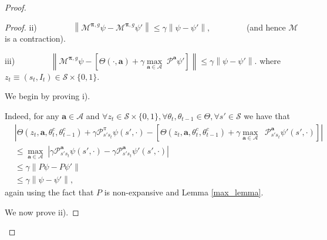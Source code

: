 \documentclass{article}
\begin{document}
\begin{proof}
\begin{proof}
ii) $\qquad\qquad
\left\|\mathcal{M}^{\boldsymbol{\pi},g}\psi-\mathcal{M}^{\boldsymbol{\pi},g}\psi'\right\|\leq    \gamma\left\|\psi-\psi'\right\|,\qquad \qquad$
  (and hence $\mathcal{M}$ is a contraction).

iii) $\qquad\qquad
    \left\|\mathcal{M}^{\boldsymbol{\pi},g}\psi-\left[ \Theta(\cdot,\boldsymbol{a})+\gamma\underset{\boldsymbol{a}\in\boldsymbol{\mathcal{A}}}{\max}\;\mathcal{P}^{\boldsymbol{a}}\psi'\right]\right\|\leq \gamma\left\|\psi-\psi'\right\|.
$
where $z_t\equiv (s_t,I_t)\in\mathcal{S}\times \{0,1\}$.

We begin by proving i).

Indeed, for any $\boldsymbol{a}\in\boldsymbol{\mathcal{A}}$ and $\forall z_t\in\mathcal{S}\times\{0,1\}, \forall \theta_t,\theta_{t-1}\in \Theta, \forall s'\in\mathcal{S}$ we have that 
\begin{align*}
&\left| \Theta(z_t,\boldsymbol{a},\theta^c_t,\theta^c_{t-1})+\gamma\mathcal{P}^\pi_{s's_t}\psi(s',\cdot)-\left[ \Theta(z_t,\boldsymbol{a},\theta^c_t,\theta^c_{t-1})+\gamma\underset{\boldsymbol{a}\in\boldsymbol{\mathcal{A}}}{\max}\;\;\mathcal{P}^{\boldsymbol{a}}_{s's_t}\psi'(s',\cdot)\right]\right|
\\&\leq \underset{\boldsymbol{a}\in\boldsymbol{\mathcal{A}}}{\max}\;\left|\gamma\mathcal{P}^{\boldsymbol{a}}_{s's_t}\psi(s',\cdot)-\gamma\mathcal{P}^{\boldsymbol{a}}_{s's_t}\psi'(s',\cdot)\right|
\\&\leq \gamma\left\|P\psi-P\psi'\right\|
\\&\leq \gamma\left\|\psi-\psi'\right\|,
\end{align*}
again using the fact that $P$ is non-expansive and Lemma \ref{max_lemma}.

We now prove ii).



\end{proof}
\end{proof}
\end{document}
